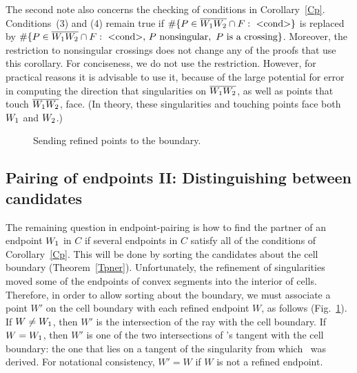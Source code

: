 The second note also concerns the checking of conditions in 
Corollary~\ref{Cp}.
Conditions~(3) and (4) remain true 
if $\#\{P \in \seg{W_{1}W_{2}} \cap F:\ \mbox{$<$cond$>$} \}$ 
is replaced by $\#\{P \in \seg{W_{1}W_{2}} \cap F:\ \mbox{$<$cond$>$},\,
P \mbox{ nonsingular},\ P \mbox{ is a crossing}\}$.  
Moreover, the restriction to nonsingular crossings does not change any 
of the 
proofs that
use this corollary.
For conciseness, we do not use the restriction.
However, for practical reasons it is advisable to use it,
because of the large potential for error in computing the direction that
singularities on $\mbox{$\overline{\mbox{$W_{1}$}\mbox{$W_{2}$}}$}$, as well as points that touch 
$\mbox{$\overline{\mbox{$W_{1}$}\mbox{$W_{2}$}}$}$, face.
(In theory, these singularities and touching points face both $\mbox{$W_{1}$}$ 
and $\mbox{$W_{2}$}$.)

\begin{figure}[htbp]\vspace{3.5in}\caption{Sending refined points 
to the boundary.}\label{3.J}\end{figure}

\subsection{Pairing of endpoints II: Distinguishing between candidates}
\label{sspII}

The remaining question in endpoint-pairing is how to find the partner 
of an endpoint $\mbox{$W_{1}$}$ in $C$ if several endpoints in $C$ satisfy all of the 
conditions of Corollary~\ref{Cp}.  
This will be done by sorting the candidates about the cell boundary
(Theorem~\ref{Tpner}).
Unfortunately, the refinement of singularities moved some of the endpoints 
of convex segments into the interior of cells.  
Therefore, in order to allow sorting about the boundary, we must associate 
a point $W'$ on the cell boundary with each refined endpoint $W$, as follows
(Fig.~\ref{3.J}).
If $W \neq \mbox{$W_{1}$}$,  then $W'$ is the intersection of the ray  
with the cell boundary.
%
%
If $W = \mbox{$W_{1}$}$, then $W'$ is one of the two intersections of \wo's 
tangent with
the cell boundary: the one that lies on a tangent of the singularity
from which \wo\ was derived.
For notational consistency, $W' = W$ if $W$ is not a refined endpoint.

